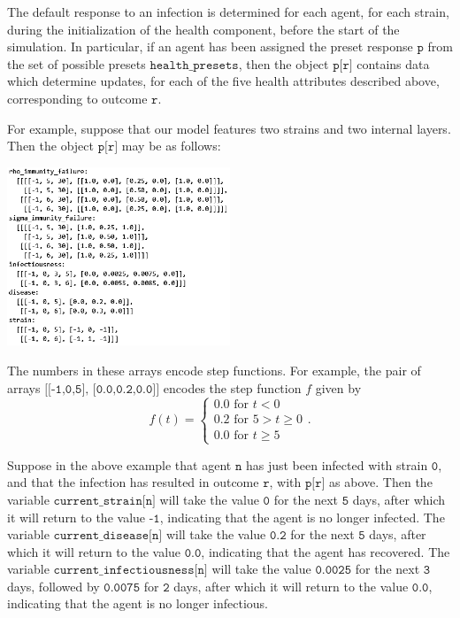 \documentclass[10pt,letterpaper]{article}
\begin{document}
The default response to an infection is determined for each agent, for each strain, during the initialization of the health component, before the start of the simulation. In particular, if an agent has been assigned the preset response $\texttt{p}$ from the set of possible presets $\texttt{health{\_}presets}$, then the object $\texttt{p[r]}$ contains data which determine updates, for each of the five health attributes described above, corresponding to outcome $\texttt{r}$.

For example, suppose that our model features two strains and two internal layers. Then the object $\texttt{p[r]}$ may be as follows:
\begin{center}
\includegraphics[width=0.5\textwidth]{codeexamplebw}
\end{center}

The numbers in these arrays encode step functions. For example, the pair of arrays $\texttt{[[-1,0,5], [0.0,0.2,0.0]]}$ encodes the step function $f$ given by
\begin{equation}
f(t) =
\begin{cases}
0.0 \text{ for } t < 0 \\
0.2 \text{ for } 5 > t \geq 0 \\
0.0 \text{ for } t \geq 5
\end{cases}.\nonumber
\end{equation}

Suppose in the above example that agent $\texttt{n}$ has just been infected with strain $\texttt{0}$, and that the infection has resulted in outcome $\texttt{r}$, with $\texttt{p[r]}$ as above. Then the variable $\texttt{current{\_}strain[n]}$ will take the value $\texttt{0}$ for the next $\texttt{5}$ days, after which it will return to the value $\texttt{-1}$, indicating that the agent is no longer infected. The variable $\texttt{current{\_}disease[n]}$ will take the value $\texttt{0.2}$ for the next $\texttt{5}$ days, after which it will return to the value $\texttt{0.0}$, indicating that the agent has recovered. The variable $\texttt{current{\_}infectiousness[n]}$ will take the value $\texttt{0.0025}$ for the next $\texttt{3}$ days, followed by $\texttt{0.0075}$ for $\texttt{2}$ days, after which it will return to the value $\texttt{0.0}$, indicating that the agent is no longer infectious.
\end{document}
